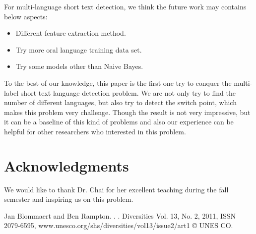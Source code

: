 \documentclass[11pt]{article}
\begin{document}
For multi-language short text detection, we think the future work may contains below aspects:
\begin{itemize}
\item Different feature extraction method.
\item Try more oral language training data set.
\item Try some models other than Naive Bayes. 
\end{itemize}
To the best of our knowledge, this paper is the first one try to conquer the multi-label short text language detection problem. We are not only try to find the number of different languages, but also try to detect the switch point, which makes this problem very challenge. Though the result is not very impressive, but it can be a baseline of this kind of problems and also our experience can be helpful for other researchers who interested in this problem.


\section{Acknowledgments}
We would like to thank Dr. Chai for her excellent teaching during the fall semester and inspiring us on this problem.


\begin{thebibliography}{}

Jan Blommaert and Ben Rampton.
.
.
\newblock Diversities Vol. 13, No. 2, 2011, ISSN 2079-6595, www.unesco.org/shs/diversities/vol13/issue2/art1 © UNES CO.
\

\end{thebibliography}
\end{document}
